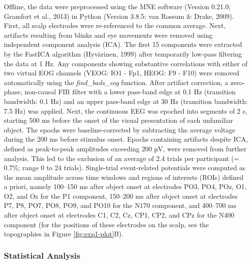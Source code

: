 \documentclass[
  english,
  man,floatsintext]{apa7}
\begin{document}
Offline, the data were preprocessed using the MNE software (Version 0.21.0; Gramfort et al., 2013) in Python (Version 3.8.5; van Rossum \& Drake, 2009). First, all scalp electrodes were re-referenced to the common average. Next, artifacts resulting from blinks and eye movements were removed using independent component analysis (ICA). The first 15 components were extracted by the FastICA algorithm (Hyvärinen, 1999) after temporarily low-pass filtering the data at 1 Hz. Any components showing substantive correlations with either of two virtual EOG channels (VEOG: IO1 - Fp1, HEOG: F9 - F10) were removed automatically using the \emph{find\_bads\_eog} function. After artifact correction, a zero-phase, non-causal FIR filter with a lower pass-band edge at 0.1 Hz (transition bandwidth: 0.1 Hz) and an upper pass-band edge at 30 Hz (transition bandwidth: 7.5 Hz) was applied. Next, the continuous EEG was epoched into segments of 2 s, starting 500 ms before the onset of the visual presentation of each unfamiliar object. The epochs were baseline-corrected by subtracting the average voltage during the 200 ms before stimulus onset. Epochs containing artifacts despite ICA, defined as peak-to-peak amplitudes exceeding 200 µV, were removed from further analysis. This led to the exclusion of an average of 2.4 trials per participant (= 0.7\%; range 0 to 24 trials). Single-trial event-related potentials were computed as the mean amplitude across time windows and regions of interests (ROIs) defined a priori, namely 100--150 ms after object onset at electrodes PO3, PO4, POz, O1, O2, and Oz for the P1 component, 150--200 ms after object onset at electrodes P7, P8, PO7, PO8, PO9, and PO10 for the N170 component, and 400--700 ms after object onset at electrodes C1, C2, Cz, CP1, CP2, and CPz for the N400 component (for the positions of these electrodes on the scalp, see the topographies in Figure \ref{fig:exp1-plot}B).

\hypertarget{statistical-analysis}{%
\subsubsection{Statistical Analysis}\label{statistical-analysis}}
\end{document}
